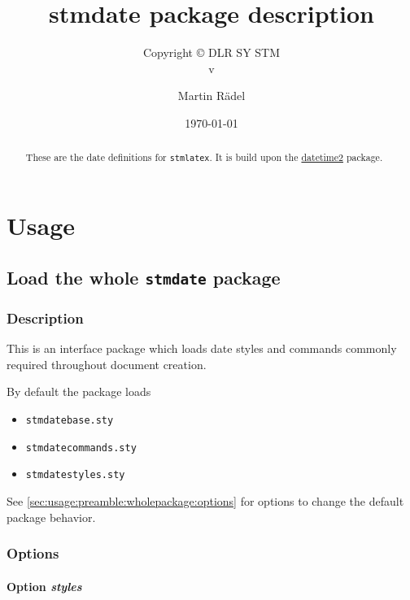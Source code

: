 \documentclass[%
  type=article,%
  layout=koma,%
  date=false,%
  hyperref=true,%
  listings=true%
]{stmtext}
\author{Martin R\"{a}del}
\title{stmdate package description}
\subtitle{Copyright \copyright{} \the\year{} DLR SY STM\\v\formatdate[versiondatestyle]{\DTMToday}}
\date{\today}
\begin{document}
\maketitle

\begin{abstract}
These are the date definitions for \texttt{stmlatex}. It is build upon the \href{https://ctan.org/pkg/datetime2}{datetime2} package.
\end{abstract}

\tableofcontents

\section{Usage}%

\subsection{Load the whole \protect\texttt{stmdate} package}
\label{sec:usage:preamble:wholepackage}

\subsubsection{Description}
\label{sec:usage:preamble:wholepackage:description}

This is an interface package which loads date styles and commands commonly required throughout document creation.

By default the package loads

\begin{itemize}[noitemsep]
  \item \verb+stmdatebase.sty+
  \item \verb+stmdatecommands.sty+
  \item \verb+stmdatestyles.sty+
\end{itemize}

See \autoref{sec:usage:preamble:wholepackage:options} for options to change the default package behavior.

\subsubsection{Options}
\label{sec:usage:preamble:wholepackage:options}

\paragraph{Option \protect\textit{styles}} 
\label{sec:usage:preamble:wholepackage:options:styles}
\end{document}
